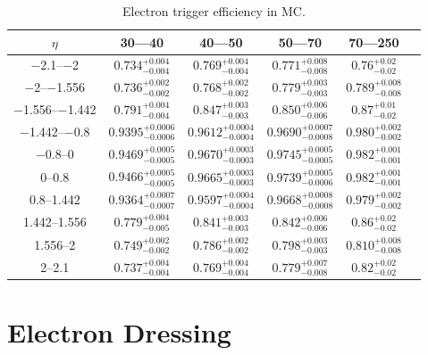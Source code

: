 \begin{table}[h]
\centering
{}
\begin{center}
    \begin{tabular}{@{}c c c c c c@{}}
    \toprule
	$\eta$ & 30---40 \GeV & 40---50 \GeV & 50---70 \GeV & 70---250 \GeV  \\
    \midrule
	\numrange{-2.1}{-2} & $0.734^{+0.004}_{-0.004}$ & $0.769^{+0.004}_{-0.004}$ & $0.771^{+0.008}_{-0.008}$ & $0.76^{+0.02}_{-0.02}$  \\
	\numrange{-2}{-1.556} & $0.736^{+0.002}_{-0.002}$ & $0.768^{+0.002}_{-0.002}$ & $0.779^{+0.003}_{-0.003}$ & $0.789^{+0.008}_{-0.008}$  \\
	\numrange{-1.556}{-1.442} & $0.791^{+0.004}_{-0.004}$ & $0.847^{+0.003}_{-0.003}$ & $0.850^{+0.006}_{-0.006}$ & $0.87^{+0.01}_{-0.02}$  \\
	\numrange{-1.442}{-0.8} & $0.9395^{+0.0006}_{-0.0006}$ & $0.9612^{+0.0004}_{-0.0004}$ & $0.9690^{+0.0007}_{-0.0008}$ & $0.980^{+0.002}_{-0.002}$  \\
	\numrange{-0.8}{0} & $0.9469^{+0.0005}_{-0.0005}$ & $0.9670^{+0.0003}_{-0.0003}$ & $0.9745^{+0.0005}_{-0.0005}$ & $0.982^{+0.001}_{-0.001}$  \\
	\numrange{0}{0.8} & $0.9466^{+0.0005}_{-0.0005}$ & $0.9665^{+0.0003}_{-0.0003}$ & $0.9739^{+0.0005}_{-0.0006}$ & $0.982^{+0.001}_{-0.001}$  \\
	\numrange{0.8}{1.442} & $0.9364^{+0.0007}_{-0.0007}$ & $0.9597^{+0.0004}_{-0.0004}$ & $0.9668^{+0.0008}_{-0.0008}$ & $0.979^{+0.002}_{-0.002}$  \\
	\numrange{1.442}{1.556} & $0.779^{+0.004}_{-0.005}$ & $0.841^{+0.003}_{-0.003}$ & $0.842^{+0.006}_{-0.006}$ & $0.86^{+0.02}_{-0.02}$  \\
	\numrange{1.556}{2} & $0.749^{+0.002}_{-0.002}$ & $0.786^{+0.002}_{-0.002}$ & $0.798^{+0.003}_{-0.003}$ & $0.810^{+0.008}_{-0.008}$  \\
	\numrange{2}{2.1} & $0.737^{+0.004}_{-0.004}$ & $0.769^{+0.004}_{-0.004}$ & $0.779^{+0.007}_{-0.008}$ & $0.82^{+0.02}_{-0.02}$  \\
    \bottomrule
    \end{tabular}
\end{center}
\caption{
    Electron trigger efficiency in \MADGRAPH MC.
}
\label{trigger_eff_mc}
\end{table}

\section{Electron Dressing}
\label{sec:electron_dressing}

